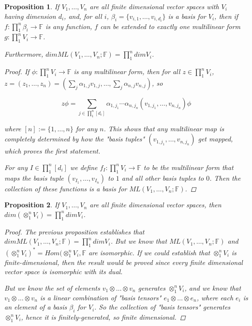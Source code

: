 \documentclass[a4paper,14pt]{article}
\newtheorem*{prop}{Proposition}
\begin{document}
\begin{prop}
    If $V_1, \ldots, V_n$ are all finite dimensional vector spaces with $V_i$ having dimension $d_i$, and, for all $i$, $\beta_i = \{v_{i,1}, \dots, v_{i,d_i}\}$ is a basis for $V_i$, then if $f: \prod_1^n \beta_i \to \mathbb{F}$ is any function, $f$ can be extended to exactly one multilinear form $g: \prod_1^n V_i \to \mathbb{F}$.

Furthermore, $dim ML(V_1, \ldots, V_n; \mathbb{F}) = \prod_1^n dim V_i$.

\begin{proof}
    If $\phi: \prod_1^n V_i \to \mathbb{F}$ is any multilinear form, then for all $z \in \prod_1^n V_i$, $z = (z_1, \dots, z_n) = (\sum_j \alpha_{1,j} v_{1,j}, \dots, \sum_j \alpha_{n,j} v_{n,j})$, so
    
$$z \phi = \sum_{j \in \prod_1^n [d_i]} \alpha_{1,j_1} \cdots \alpha_{n,j_n} (v_{1,j_1}, \ldots, v_{n,j_n}) \phi$$

where $[n] := \{1, \ldots, n\}$ for any $n$. This shows that any multilinear map is completely determined by how the "basis tuples" $(v_{1,j_1}, \ldots, v_{n,j_n})$ get mapped, which proves the first statement.

For any $I \in \prod_1^n [d_i]$ we define $f_I: \prod_1^n V_i \to \mathbb{F}$ to be the multilinear form that maps the basis tuple $(v_{I_1}, \ldots, v_{I_n})$ to $1$ and all other basis tuples to $0$. Then the collection of these functions is a basis for $ML(V_1, \ldots, V_n; \mathbb{F})$.
\end{proof}
\end{prop}

\begin{prop}
If $V_1, \ldots, V_n$ are all finite dimensional vector spaces, then $dim(\otimes_1^n V_i) = \prod_1^n dim V_i$.
\begin{proof}
The previous proposition establishes that $dim ML(V_1, \ldots, V_n; \mathbb{F}) = \prod_1^n dim V_i$. But we know that $ML(V_1, \ldots, V_n; \mathbb{F})$ and $(\otimes_1^n V_i)^{\ast} = Hom(\otimes_1^n V_i, \mathbb{F}$ are isomorphic. If we could establish that $\otimes_1^n V_i$ is finite-dimensional, then the result would be proved since every finite dimensional vector space is isomorphic with its dual.

But we know the set of elements $v_1 \otimes \dots \otimes v_n$ generates $\otimes_1^n V_i$, and we know that $v_1 \otimes \dots \otimes v_n$ is a linear combination of "basis tensors" $e_1 \otimes \dots \otimes e_n$, where each $e_i$ is an element of a basis $\beta_i$ for $V_i$. So the collection of "basis tensors" generates $\otimes_1^n V_i$, hence it is finitely-generated, so finite dimensional.
\end{proof}
\end{prop}
\end{document}
